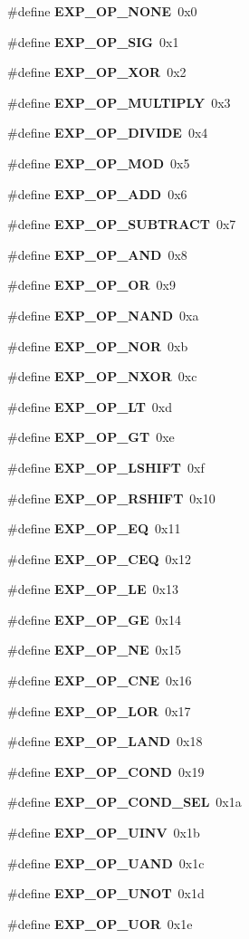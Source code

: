 \begin{CompactItemize}
\#define {\bf EXP\_\-OP\_\-NONE}\ 0x0
\item 
\#define {\bf EXP\_\-OP\_\-SIG}\ 0x1
\item 
\#define {\bf EXP\_\-OP\_\-XOR}\ 0x2
\item 
\#define {\bf EXP\_\-OP\_\-MULTIPLY}\ 0x3
\item 
\#define {\bf EXP\_\-OP\_\-DIVIDE}\ 0x4
\item 
\#define {\bf EXP\_\-OP\_\-MOD}\ 0x5
\item 
\#define {\bf EXP\_\-OP\_\-ADD}\ 0x6
\item 
\#define {\bf EXP\_\-OP\_\-SUBTRACT}\ 0x7
\item 
\#define {\bf EXP\_\-OP\_\-AND}\ 0x8
\item 
\#define {\bf EXP\_\-OP\_\-OR}\ 0x9
\item 
\#define {\bf EXP\_\-OP\_\-NAND}\ 0xa
\item 
\#define {\bf EXP\_\-OP\_\-NOR}\ 0xb
\item 
\#define {\bf EXP\_\-OP\_\-NXOR}\ 0xc
\item 
\#define {\bf EXP\_\-OP\_\-LT}\ 0xd
\item 
\#define {\bf EXP\_\-OP\_\-GT}\ 0xe
\item 
\#define {\bf EXP\_\-OP\_\-LSHIFT}\ 0xf
\item 
\#define {\bf EXP\_\-OP\_\-RSHIFT}\ 0x10
\item 
\#define {\bf EXP\_\-OP\_\-EQ}\ 0x11
\item 
\#define {\bf EXP\_\-OP\_\-CEQ}\ 0x12
\item 
\#define {\bf EXP\_\-OP\_\-LE}\ 0x13
\item 
\#define {\bf EXP\_\-OP\_\-GE}\ 0x14
\item 
\#define {\bf EXP\_\-OP\_\-NE}\ 0x15
\item 
\#define {\bf EXP\_\-OP\_\-CNE}\ 0x16
\item 
\#define {\bf EXP\_\-OP\_\-LOR}\ 0x17
\item 
\#define {\bf EXP\_\-OP\_\-LAND}\ 0x18
\item 
\#define {\bf EXP\_\-OP\_\-COND}\ 0x19
\item 
\#define {\bf EXP\_\-OP\_\-COND\_\-SEL}\ 0x1a
\item 
\#define {\bf EXP\_\-OP\_\-UINV}\ 0x1b
\item 
\#define {\bf EXP\_\-OP\_\-UAND}\ 0x1c
\item 
\#define {\bf EXP\_\-OP\_\-UNOT}\ 0x1d
\item 
\#define {\bf EXP\_\-OP\_\-UOR}\ 0x1e

\end{CompactItemize}

